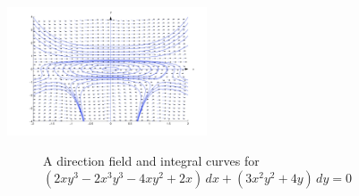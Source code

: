 \documentclass{ximera}
\begin{document}
\begin{example}
\begin{explanation}
\begin{image}
 \includegraphics[height=1.5in]{fig020601.jpg}
\end{image}
\begin{center}
  \begin{figure}
  \caption{A direction field and  integral curves for
$(2xy^3-2x^3y^3-4xy^2+2x)\,dx+(3x^2y^2+4y)\,dy=0$}
  \label{figure:2.6.1}
\end{figure}
\end{center}
\end{explanation}
\end{example}
\end{document}
